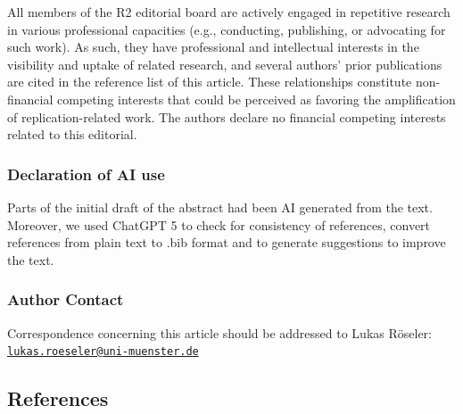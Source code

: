 \documentclass[11pt,a4paper]{article}
\begin{document}
All members of the R2 editorial board are actively engaged in repetitive
research in various professional capacities (e.g., conducting,
publishing, or advocating for such work). As such, they have
professional and intellectual interests in the visibility and uptake of
related research, and several authors' prior publications are cited in
the reference list of this article. These relationships constitute
non-financial competing interests that could be perceived as favoring
the amplification of replication-related work. The authors declare no
financial competing interests related to this editorial.

\subsubsection*{Declaration of AI use}\label{declaration-of-ai-use}

Parts of the initial draft of the abstract had been AI generated from
the text. Moreover, we used ChatGPT 5 to check for consistency of
references, convert references from plain text to .bib format and to
generate suggestions to improve the text.

\subsubsection*{Author Contact}\label{author-contact}

Correspondence concerning this article should be addressed to Lukas
Röseler:
\href{mailto:lukas.roeseler@uni-muenster.de}{\nolinkurl{lukas.roeseler@uni-muenster.de}}

\subsection*{References}\label{references}

\printbibliography[heading=none]
\end{document}
